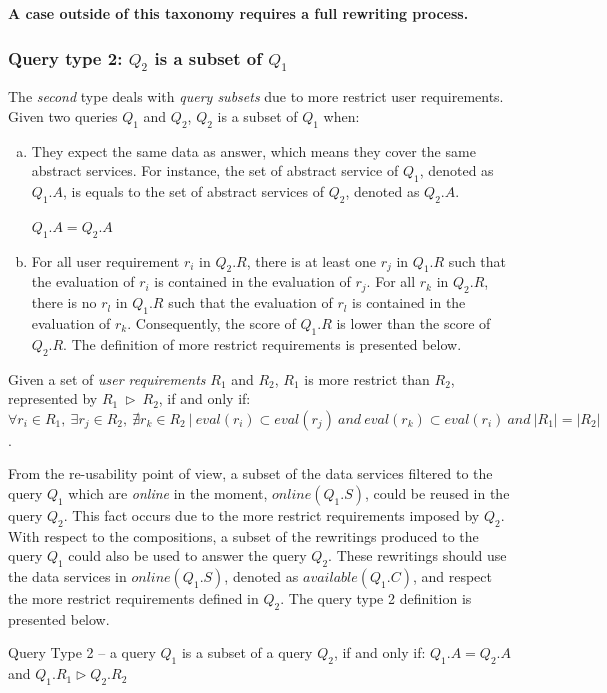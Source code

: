 \textbf{A case outside of this taxonomy requires a full rewriting process.}

\subsubsection{Query type 2: $Q_{2}$ is a subset of $Q_{1}$}

The \textit{second} type deals with \textit{query subsets} due to more restrict user requirements. Given two queries $Q_{1}$ and $Q_{2}$, $Q_{2}$ is a subset of $Q_{1}$ when:
%
\begin{enumerate}[a)]
\item They expect the same data as answer, which means they cover the same abstract services. 
For instance, the set of abstract service of $Q_{1}$, denoted as $Q_{1}.A$, is equals to the set of abstract services of $Q_{2}$, denoted as $Q_{2}.A$.
%
\begin{center}
$Q_{1}.A = Q_{2}.A$
\end{center}
%
\item For all user requirement $r_{i}$ in $Q_{2}.R$, there is at least one $r_{j}$ in $Q_{1}.R$ such that the evaluation of $r_{i}$ is contained in the evaluation of $r_{j}$. 
For all $r_{k}$ in $Q_{2}.R$, there is no $r_{l}$ in $Q_{1}.R$ such that the evaluation of $r_{l}$ is contained in the evaluation of $r_{k}$. 
Consequently, the score of $Q_{1}.R$ is lower than the score of $Q_{2}.R$. The definition of more restrict requirements is presented below.
\end{enumerate}

\begin{definition}\label{def:reqmore}
Given a set of \textsl{user requirements} $R_{1}$ and $R_{2}$, $R_{1}$ is more restrict than $R_{2}$, represented by $R_{1} \ \rhd \ R_{2}$, if and only if: $\forall r_{i} \in R_{1}, \ \exists r_{j} \in R_{2}, \ \nexists r_{k} \in R_{2} \ \vert \ eval (r_{i}) \subset eval(r_{j}) \ and \ eval (r_{k}) \subset eval(r_{i}) \ and \ \vert R_{1} \vert = \vert R_{2} \vert$.
\end{definition}

From the re-usability point of view, a subset of the data services filtered to the query $Q_{1}$ which are \textit{online} in the moment, $online(Q_{1}.S)$, could be reused in the query $Q_{2}$. This fact occurs due to the more restrict requirements imposed by $Q_{2}$.
With respect to the compositions, a subset of the rewritings produced to the query $Q_{1}$ could also be used to answer the query $Q_{2}$. These rewritings should use the data services in $online(Q_{1}.S)$, denoted as $available(Q_{1}.C)$, and respect the more restrict requirements defined in $Q_{2}$. 
The query type 2 definition is presented below.

\begin{definition}\label{def:qt2}
Query Type 2 -- a query $Q_{1}$ is a subset of a query $Q_{2}$, if and only if: $Q_{1}.A = Q_{2}.A$ and $Q_{1}.R_{1} \rhd Q_{2}.R_{2}$
\end{definition}
